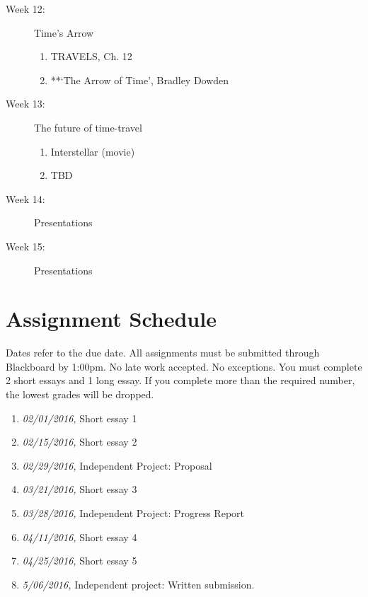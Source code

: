 \documentclass[article,oneside]{memoir}
\begin{document}
\begin{description}
\item[Week 12:] Time's Arrow
\begin{enumerate}
\item TRAVELS, Ch. 12
\item **`The Arrow of Time', Bradley Dowden
\end{enumerate}


\item[Week 13:]  The future of time-travel
\begin{enumerate}
\item Interstellar (movie)
\item TBD
\end{enumerate}



\item[Week 14:] Presentations




\item[Week 15:] Presentations
 \end{description}

\section{ Assignment Schedule}
Dates refer to the due date. All assignments must be submitted through Blackboard by 1:00pm. No late work accepted. No exceptions. You must complete 2 short essays and 1 long essay. If you complete more than the required number, the lowest grades will be dropped.
\begin{enumerate}
\item \textit{02/01/2016,} Short essay 1
\item \textit{02/15/2016,} Short essay 2
\item \textit{02/29/2016,} Independent Project: Proposal
\item \textit{03/21/2016,} Short essay 3
\item \textit{03/28/2016,} Independent Project: Progress Report
\item \textit{04/11/2016,} Short essay 4
\item \textit{04/25/2016,} Short essay 5
\item \textit{5/06/2016,} Independent project: Written submission.
\end{enumerate}




\end{document}
